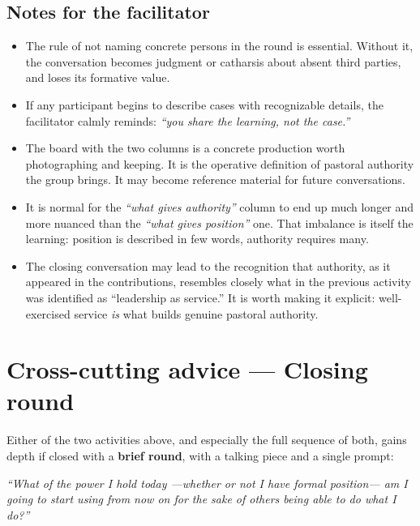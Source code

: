 \documentclass[11pt, a4paper]{article}
\begin{document}
\begin{actividad}
\subsection*{Notes for the facilitator}
\begin{itemize}
  \item The rule of not naming concrete persons in the round is essential. Without it, the conversation becomes judgment or catharsis about absent third parties, and loses its formative value.
  \item If any participant begins to describe cases with recognizable details, the facilitator calmly reminds: \emph{``you share the learning, not the case.''}
  \item The board with the two columns is a concrete production worth photographing and keeping. It is the operative definition of pastoral authority the group brings. It may become reference material for future conversations.
  \item It is normal for the \emph{``what gives authority''} column to end up much longer and more nuanced than the \emph{``what gives position''} one. That imbalance is itself the learning: position is described in few words, authority requires many.
  \item The closing conversation may lead to the recognition that authority, as it appeared in the contributions, resembles closely what in the previous activity was identified as ``leadership as service.'' It is worth making it explicit: well-exercised service \emph{is} what builds genuine pastoral authority.
\end{itemize}

\end{actividad}

\newpage

\section*{Cross-cutting advice --- Closing round}

Either of the two activities above, and especially the full sequence of both, gains depth if closed with a \textbf{brief round}, with a talking piece and a single prompt:

\vspace{0.5em}

\begin{center}
\begin{tcolorbox}[
  enhanced, colback=liderazgoVino, colframe=liderazgoVino,
  boxrule=0pt, arc=3pt,
  left=18pt, right=18pt, top=16pt, bottom=16pt,
  width=0.90\linewidth,
  halign=center
]
  {\color{parch}\itshape\large ``What of the power I hold today ---whether or not I have formal position--- am I going to start using from now on for the sake of others being able to do what I do?''}
\end{tcolorbox}
\end{center}
\end{document}
